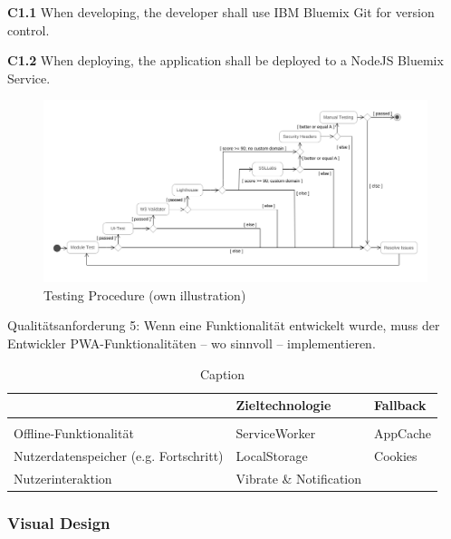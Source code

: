 \begin{closeItem}
      \item [\textbf{C1.1}] When developing, the developer shall use IBM Bluemix Git for version control.
      \item [\textbf{C1.2}] When deploying, the application shall be deployed to a NodeJS Bluemix Service.
\end{closeItem}

\begin{figure}[H]
    \centering
    \includegraphics[width=\textwidth]{img/diagrams/Activity/Testing.png}
    \caption[Testing Procedure]{Testing Procedure (own illustration)}
    \label{fig:test}
\end{figure}

Qualitätsanforderung 5: Wenn eine Funktionalität entwickelt wurde, muss der Entwickler PWA-Funktionalitäten – wo sinnvoll – implementieren.

\begin{table}[]
    \centering
    \begin{tabular}{|m{5.33cm}|m{5.33cm}|m{5.33cm}|}
    &   Zieltechnologie &   Fallback    \\
    \hline \\
Offline-Funktionalität  &	ServiceWorker   &   AppCache    \\
Nutzerdatenspeicher (e.g. Fortschritt)	&   LocalStorage    &   Cookies    \\
Nutzerinteraktion	&   Vibrate \& Notification  & ~~~  \\
    \end{tabular}
    \caption{Caption}
    \label{tab:my_label}
\end{table}



\subsubsection{Visual Design}

